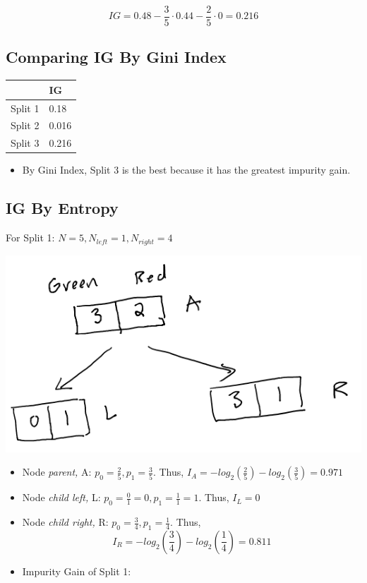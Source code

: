 \documentclass[
]{article}
\providecommand{\tightlist}{%
  \setlength{\itemsep}{0pt}\setlength{\parskip}{0pt}}
\begin{document}
\[IG = 0.48 - \frac{3}{5} \cdot 0.44 - \frac{2}{5} \cdot 0 = 0.216\]

\hypertarget{comparing-ig-by-gini-index}{%
\subsection{Comparing IG By Gini
Index}\label{comparing-ig-by-gini-index}}

\begin{longtable}[]{@{}ll@{}}
\toprule
& IG \\
\midrule
\endhead
Split 1 & 0.18 \\
Split 2 & 0.016 \\
Split 3 & 0.216 \\
\bottomrule
\end{longtable}

\begin{itemize}
\tightlist
\item
  By Gini Index, Split 3 is the best because it has the greatest
  impurity gain.
\end{itemize}

\hypertarget{ig-by-entropy}{%
\subsection{IG By Entropy}\label{ig-by-entropy}}

For Split 1: \(N = 5, N_{left} =1, N_{right} = 4\)

\includegraphics{images/im1.png}

\begin{itemize}
\item
  Node \emph{parent,} A: \(p_0 = \frac{2}{5}, p_1 = \frac{3}{5}\). Thus,
  \(I_{A} = - log_2(\frac{2}{5})-log_2(\frac{3}{5}) = 0.971\)
\item
  Node \emph{child left,} L:
  \(p_0 = \frac{0}{1} = 0, p_1 = \frac{1}{1} = 1\). Thus, \(I_{L} = 0\)
\item
  Node \emph{child right,} R: \(p_0 = \frac{3}{4}, p_1 = \frac{1}{4}\).
  Thus, \[I_{R} = -log_2(\frac{3}{4})-log_2(\frac{1}{4}) = 0.811\]
\item
  Impurity Gain of Split 1:
\end{itemize}
\end{document}
